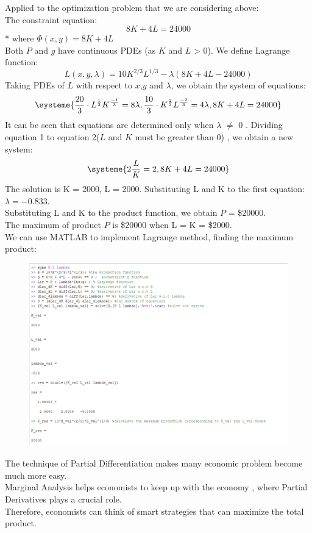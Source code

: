 \documentclass[a4paper]{article}
\begin{document}
	Applied to the optimization problem that we are considering above: \\
	The constraint equation:
	\begin{equation*}
	8K + 4L  = 24000
	\end{equation*}*
	where $\Phi(x,y) = 8K + 4L$ \\
	Both $P$ and $g$ have continuous PDEs (as $K$ and $L$ > 0). We define Lagrange function:
	\begin{equation*}
	L(x,y,\lambda) = 10K^{2/3}L^{1/3} - \lambda(8K + 4L -24000)
	\end{equation*}
	Taking PDEs of $L$ with respect to $x$,$y$ and $\lambda$, we obtain the system of equations:
	\[
	\systeme{\frac{20}{3} \cdot L^{\frac{1}{3}} K^{\frac{-1}{3}} = 8\lambda ,\frac{10}{3} \cdot K^{\frac{2}{3}} L^{\frac{-2}{3}}  = 4\lambda , 8K + 4L  = 24000}
	\]
	It can be seen that equations are determined only when $\lambda$ $\neq$ 0 . Dividing equation 1 to equation 2($L$ and $K$ must be greater than 0) , we obtain a new system:
	\[
	\systeme{2\frac{L}{K} = 2, 8K + 4L = 24000}
	\]
	The solution is K = 2000, L = 2000. Substituting L and K to the first equation: $\lambda = -0.833 $. \\
	Substituting L and K to the product function, we obtain $P$ = \$20000. \\
	The maximum of product $P$ is \$20000 when L = K = \$2000. \\
	We can use MATLAB to implement Lagrange method, finding the maximum product:
	\begin{figure}[H]
		\centering
		\includegraphics[width=1\textwidth]{PDE3.png}
	\end{figure}
	The technique of Partial Differentiation makes many economic problem become much more easy. \\
	Marginal Analysis helps economists to keep up with the economy , where Partial Derivatives plays a crucial role. \\ Therefore, economists can think of smart strategies that can maximize the total product.
	\newpage
\end{document}
